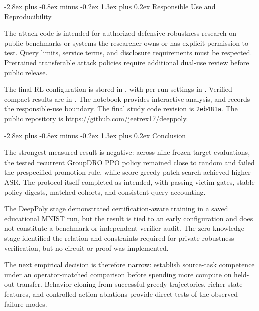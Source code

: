 \documentclass[11pt,a4paper]{article}
\makeatletter
\renewcommand\section{\@startsection{section}{1}{0pt}
  {-2.8ex plus -0.8ex minus -0.2ex}
  {1.3ex plus 0.2ex}
  {\normalfont\large\bfseries\color{researchnavy}}}
\makeatother
\begin{document}
\section{Responsible Use and Reproducibility}

The attack code is intended for authorized defensive robustness research on public benchmarks or systems the researcher owns or has explicit permission to test. Query limits, service terms, and disclosure requirements must be respected. Pretrained transferable attack policies require additional dual-use review before public release.

The final RL configuration is stored in
, with per-run settings in
. Verified compact results are in
. The notebook
 provides interactive analysis, and
 records the responsible-use boundary. The final study code revision is
\texttt{2eb481a}. The public repository is
\url{https://github.com/jeetrex17/deeppoly}.

\section{Conclusion}

The strongest measured result is negative: across nine frozen target evaluations, the tested recurrent GroupDRO PPO policy remained close to random and failed the prespecified promotion rule, while score-greedy patch search achieved higher ASR. The protocol itself completed as intended, with passing victim gates, stable policy digests, matched cohorts, and consistent query accounting.

The DeepPoly stage demonstrated certification-aware training in a saved educational MNIST run, but the result is tied to an early configuration and does not constitute a benchmark or independent verifier audit. The zero-knowledge stage identified the relation and constraints required for private robustness verification, but no circuit or proof was implemented.

The next empirical decision is therefore narrow: establish source-task competence under an operator-matched comparison before spending more compute on held-out transfer. Behavior cloning from successful greedy trajectories, richer state features, and controlled action ablations provide direct tests of the observed failure modes.
\end{document}
